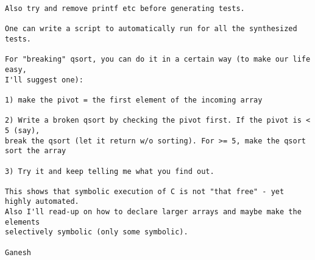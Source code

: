 \documentclass[11pt]{article}
\begin{document}
\begin{enumerate}
\begin{scriptsize}
\begin{verbatim}
Also try and remove printf etc before generating tests.

One can write a script to automatically run for all the synthesized tests.

For "breaking" qsort, you can do it in a certain way (to make our life easy,
I'll suggest one):

1) make the pivot = the first element of the incoming array

2) Write a broken qsort by checking the pivot first. If the pivot is < 5 (say),
break the qsort (let it return w/o sorting). For >= 5, make the qsort sort the array

3) Try it and keep telling me what you find out.

This shows that symbolic execution of C is not "that free" - yet highly automated.
Also I'll read-up on how to declare larger arrays and maybe make the elements
selectively symbolic (only some symbolic).

Ganesh
  \end{verbatim}
  \end{scriptsize}

  


\end{enumerate}
\end{document}
